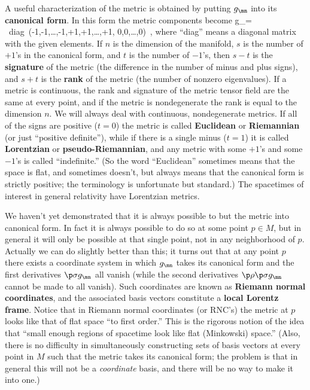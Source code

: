 A useful characterization of the metric is obtained by putting $g_\mn$
into its {\bf canonical form}.  In this form the metric components become
\be
  g_\mn = {\rm ~diag~}(-1,-1,\ldots,-1,+1,+1,\ldots,+1,
  0,0,\ldots,0)\ ,\label{2.34}
\ee
where ``diag'' means a diagonal matrix with the given elements.  If
$n$ is the dimension of the manifold, $s$ is the number of $+1$'s in
the canonical form, and $t$ is the number of $-1$'s, then
$s-t$ is the {\bf signature}
of the metric (the difference in the number of minus and plus signs),
and $s+t$ is the {\bf rank} of the metric (the number of nonzero
eigenvalues).  If a metric is continuous, the rank and signature of
the metric tensor field are the same at every point, and if the metric
is nondegenerate the rank is equal to the dimension $n$.  We will
always deal with continuous, nondegenerate metrics.  If all of the
signs are positive ($t=0$) the metric is called {\bf Euclidean} or
{\bf Riemannian} (or just ``positive definite''), while if there is a 
single minus ($t=1$) it is called {\bf Lorentzian} or 
{\bf pseudo-Riemannian}, and any metric with some $+1$'s and some 
$-1$'s is called ``indefinite.''  (So the word ``Euclidean''
sometimes means that the space is flat, and sometimes doesn't, but
always means that the canonical form is strictly positive; the
terminology is unfortunate but standard.)  The spacetimes of interest
in general relativity have Lorentzian metrics.

We haven't yet demonstrated that it is always possible to but the metric
into canonical form.  In fact it is always
possible to do so at some point $p\in M$, but in general it will only
be possible at that single point, not in any neighborhood of $p$.
Actually we can do slightly better than this; it turns out that at
any point $p$ there exists a coordinate system in which $g_\mn$ takes
its canonical form and the first derivatives $\p\sigma g_\mn$ all vanish 
(while the second derivatives $\p\rho \p\sigma g_\mn$ cannot be made
to all vanish).  Such coordinates are known as {\bf Riemann normal
coordinates}, and  the associated basis vectors constitute
a {\bf local Lorentz frame}.  Notice
that in Riemann normal coordinates (or RNC's) the metric at $p$ looks 
like that of flat space ``to first order.''  This is the rigorous
notion of the idea that ``small enough regions of spacetime look like
flat (Minkowski) space.''  (Also, there is no difficulty in simultaneously
constructing sets of basis vectors at every point in $M$ such that the
metric takes its canonical form; the problem is that in general this
will not be a {\it coordinate} basis, and there will be no way to
make it into one.)

